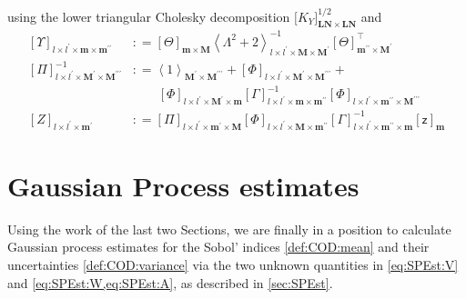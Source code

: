 \documentclass[preprint,12pt]{elsarticle}
\newcommand*{\M}[1]{\ensuremath{#1}\xspace}
\newcommand*{\x}{\times}
\newcommand*{\mi}[1]{\mathbf{#1}}
\newcommand*{\rv}[1]{\mathsf{#1}}
\newcommand*{\te}[2][]{\left\lbrack{#2}\right\rbrack_{#1}}
\newcommand*{\tte}[2][]{\lbrack{#2}\rbrack_{#1}}
\newcommand*{\diag}[2][]{\left\langle{#2}\right\rangle_{#1}}
\newcommand*{\deq}{\M{\mathrel{\mathop:}=}}
\begin{document}
            using the lower triangular Cholesky decomposition $\tte[\mi{LN}\x\mi{LN}]{K_{Y}}^{1/2}$ and
            \begin{equation*}
                \begin{aligned}
                    \te[l\x l^{\prime}\x\mi{m}\x\mi{m^{\prime\prime}}]{\Upsilon} &\deq 
                    \te[\mi{m}\x\mi{M}]{\Theta}
                    \diag[l\x l^{\prime}\x\mi{M}\x\mi{M^{\prime}}]{\Lambda^{2}+2}^{-1} \te[\mi{m^{\prime\prime}}\x\mi{M^{\prime}}]{\Theta}^{\intercal} \\
                    \te[l\x l^{\prime}\x \mi{M^{\prime}}\x\mi{M^{\prime\prime\prime}}]{\Pi}^{-1} &\deq 
                    \diag[\mi{M^{\prime}}\x\mi{M^{\prime\prime\prime}}]{1} + \te[l\x l^{\prime}\x \mi{M^{\prime}}\x\mi{M^{\prime\prime\prime}}]{\Phi} + \\
                    &\phantom{\deq}\ \te[l\x l^{\prime}\x\mi{M^{\prime}\x\mi{m}}]{\Phi}
                    \te[l\x l^{\prime}\x\mi{m}\x\mi{m^{\prime\prime}}]{\Gamma}^{-1} \te[l\x l^{\prime}\x\mi{m^{\prime\prime}}\x\mi{M^{\prime\prime\prime}}]{\Phi} \\
                    \te[l\x l^{\prime}\x \mi{m^{\prime}}]{Z} &\deq 
                    \te[l\x l^{\prime}\x \mi{m^{\prime}}\x\mi{M}]{\Pi}
                    \te[l\x l^{\prime}\x\mi{M}\x\mi{m^{\prime\prime}}]{\Phi}
                    \te[l\x l^{\prime}\x\mi{m^{\prime\prime}}\x\mi{m}]{\Gamma}^{-1}
                    \te[\mi{m}]{\rv{z}}
                \end{aligned}
            \end{equation*}


\section{Gaussian Process estimates}\label{sec:GPEst}
    Using the work of the last two Sections, we are finally in a position to calculate Gaussian process estimates for the Sobol' indices \cref{def:COD:mean} and their uncertainties \cref{def:COD:variance} via the two unknown quantities in \cref{eq:SPEst:V} and \cref{eq:SPEst:W,eq:SPEst:A}, as described in \cref{sec:SPEst}.
\end{document}
